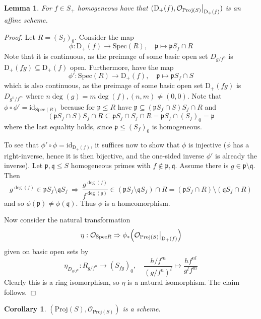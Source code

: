 \documentclass{scrartcl}
\newcommand{\D}[1]{\mathrm{D}_+(#1)}
\newcommand{\p}{\mathfrak{p}}
\newcommand{\q}{\mathfrak{q}}
\newcommand{\Spec}{\mathrm{Spec}}
\newcommand{\Proj}{\mathrm{Proj}}
\renewcommand{\O}{\mathcal{O}}
\newcommand\restr[2]{{
    \left.\kern-\nulldelimiterspace
    #1
    \vphantom{\big|}
    \right|_{#2}
}}
\newtheorem{lemma}[subsection]{Lemma}
\newtheorem{corollary}[subsection]{Corollary}
\theoremstyle{definition}
\begin{document}
\begin{lemma}
    \label{prop:Df_affine}
    For $f \in S_+$ homogeneous have that $(\D{f}, \restr{\O_{\Proj(S)}}{\D{f}})$ is an affine scheme.
\end{lemma}
\begin{proof}
    Let $R = (S_f)_0$.
    Consider the map
    \begin{equation*}
        \phi: \D{f} \to \Spec(R), \quad \p \mapsto \p S_f \cap R
    \end{equation*}
    Note that it is continuous, as the preimage of some basic open set $D_{g/f^n}$ is $\D{fg} \subseteq \D{f}$ open.
    Furthermore, have the map
    \begin{equation*}
        \phi': \Spec(R) \to \D{f}, \quad \p \mapsto \p S_f \cap S
    \end{equation*}
    which is also continuous, as the preimage of some basic open set $\D{fg}$ is $D_{g^n/f^m}$ where $n\deg(g) = m\deg(f), (n, m) \neq (0, 0)$.
    Note that $\phi \circ \phi' = \mathrm{id}_{\Spec(R)}$ because for $\p \leq R$ have $\p \subseteq (\p S_f \cap S) S_f \cap R$ and
    \begin{equation*}
        (\p S_f \cap S) S_f \cap R \subseteq \p S_f \cap S_f \cap R = \p S_f \cap (S_f)_0 = \p
    \end{equation*}
    where the last equality holds, since $\p \leq (S_f)_0$ is homogeneous.
    
    To see that $\phi' \circ \phi = \mathrm{id}_{\D{f}}$, it suffices now to show that $\phi$ is injective ($\phi$ has a right-inverse, hence it is then bijective, and the one-sided inverse $\phi'$ is already the inverse).
    Let $\p, \q \leq S$ homogeneous primes with $f \notin \p, \q$.
    Assume there is $g \in \p \setminus \q$.
    Then
    \begin{equation*}
        g^{\deg(f)} \in \p S_f \setminus \q S_f  \ \Rightarrow \ \frac {g^{\deg(f)}} {f^{\deg(g)}} \in (\p S_f \setminus \q S_f) \cap R = (\p S_f \cap R) \setminus (\q S_f \cap R)
    \end{equation*}
    and so $\phi(\p) \neq \phi(\q)$. Thus $\phi$ is a homeomorphism.

    Now consider the natural transformation
    \begin{equation*}
        \eta: \O_{\Spec R} \Rightarrow \phi_*\Bigl( \restr{\O_{\Proj(S)}}{\D{f}} \Bigr)
    \end{equation*}
    given on basic open sets by
    \begin{equation*}
        \eta_{D_{g/f^n}}: R_{g/f^n} \to (S_{f g})_0, \quad \frac {h/f^m} {(g/f^n)^l} \mapsto \frac {h f^{nl}} {g^l f^m}
    \end{equation*}
    Clearly this is a ring isomorphism, so $\eta$ is a natural isomorphism.
    The claim follows.
\end{proof}
\begin{corollary}
    $(\Proj(S), \O_{\Proj(S)})$ is a scheme.
\end{corollary}
\end{document}
